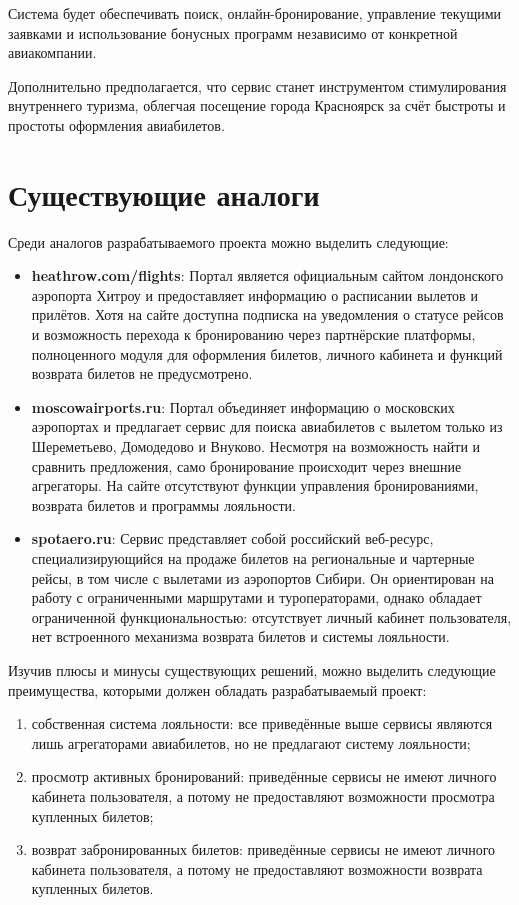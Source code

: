 Система будет обеспечивать поиск, онлайн-бронирование, управление текущими заявками и использование бонусных программ независимо от конкретной авиакомпании.

Дополнительно предполагается, что сервис станет инструментом стимулирования внутреннего туризма, облегчая посещение города Красноярск за счёт быстроты и простоты оформления авиабилетов.

\section*{Существующие аналоги}

Среди аналогов разрабатываемого проекта можно выделить следующие:
\begin{itemize}
    \item \textbf{heathrow.com/flights}: Портал является официальным сайтом лондонского аэропорта Хитроу и предоставляет информацию о расписании вылетов и прилётов. Хотя на сайте доступна подписка на уведомления о статусе рейсов и возможность перехода к бронированию через партнёрские платформы, полноценного модуля для оформления билетов, личного кабинета и функций возврата билетов не предусмотрено.
    \item \textbf{moscowairports.ru}: Портал объединяет информацию о московских аэропортах и предлагает сервис для поиска авиабилетов с вылетом только из Шереметьево, Домодедово и Внуково. Несмотря на возможность найти и сравнить предложения, само бронирование происходит через внешние агрегаторы. На сайте отсутствуют функции управления бронированиями, возврата билетов и программы лояльности.
    \item \textbf{spotaero.ru}: Сервис представляет собой российский веб-ресурс, специализирующийся на продаже билетов на региональные и чартерные рейсы, в том числе с вылетами из аэропортов Сибири. Он ориентирован на работу с ограниченными маршрутами и туроператорами, однако обладает ограниченной функциональностью: отсутствует личный кабинет пользователя, нет встроенного механизма возврата билетов и системы лояльности.
\end{itemize}

Изучив плюсы и минусы существующих решений, можно выделить следующие преимущества, которыми должен обладать разрабатываемый проект:
\begin{enumerate}
	\item собственная система лояльности: все приведённые выше сервисы являются лишь агрегаторами авиабилетов, но не предлагают систему лояльности;
	\item просмотр активных бронирований: приведённые сервисы не имеют личного кабинета пользователя, а потому не предоставляют возможности просмотра купленных билетов;
	\item возврат забронированных билетов: приведённые сервисы не имеют личного кабинета пользователя, а потому не предоставляют возможности возврата купленных билетов.
\end{enumerate}

